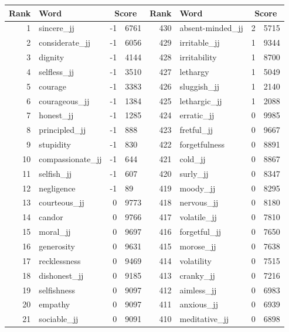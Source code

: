 \begin{table}[tbp]
    \begin{tabular}{| rlr@{.}l | rlr@{.}l |}
    \hline
    \textbf{Rank} & \textbf{Word} & \multicolumn{2}{c|}{\textbf{Score}} & \textbf{Rank} & \textbf{Word} & \multicolumn{2}{c|}{\textbf{Score}} \\
    \hline
    1 & sincere\_jj & -1 & 6761    &    430 & absent-minded\_jj & 2 & 5715 \\
    2 & considerate\_jj & -1 & 6056    &    429 & irritable\_jj & 1 & 9344 \\
    3 & dignity & -1 & 4144    &    428 & irritability & 1 & 8700 \\
    4 & selfless\_jj & -1 & 3510    &    427 & lethargy & 1 & 5049 \\
    5 & courage & -1 & 3383    &    426 & sluggish\_jj & 1 & 2140 \\
    6 & courageous\_jj & -1 & 1384    &    425 & lethargic\_jj & 1 & 2088 \\
    7 & honest\_jj & -1 & 1285    &    424 & erratic\_jj & 0 & 9985 \\
    8 & principled\_jj & -1 & 888    &    423 & fretful\_jj & 0 & 9667 \\
    9 & stupidity & -1 & 830    &    422 & forgetfulness & 0 & 8891 \\
    10 & compassionate\_jj & -1 & 644    &    421 & cold\_jj & 0 & 8867 \\
    11 & selfish\_jj & -1 & 607    &    420 & surly\_jj & 0 & 8347 \\
    12 & negligence & -1 & 89    &    419 & moody\_jj & 0 & 8295 \\
    13 & courteous\_jj & 0 & 9773    &    418 & nervous\_jj & 0 & 8180 \\
    14 & candor & 0 & 9766    &    417 & volatile\_jj & 0 & 7810 \\
    15 & moral\_jj & 0 & 9697    &    416 & forgetful\_jj & 0 & 7650 \\
    16 & generosity & 0 & 9631    &    415 & morose\_jj & 0 & 7638 \\
    17 & recklessness & 0 & 9469    &    414 & volatility & 0 & 7515 \\
    18 & dishonest\_jj & 0 & 9185    &    413 & cranky\_jj & 0 & 7216 \\
    19 & selfishness & 0 & 9097    &    412 & aimless\_jj & 0 & 6983 \\
    20 & empathy & 0 & 9097    &    411 & anxious\_jj & 0 & 6939 \\
    21 & sociable\_jj & 0 & 9091    &    410 & meditative\_jj & 0 & 6898 \\

\end{tabular}
\end{table}
